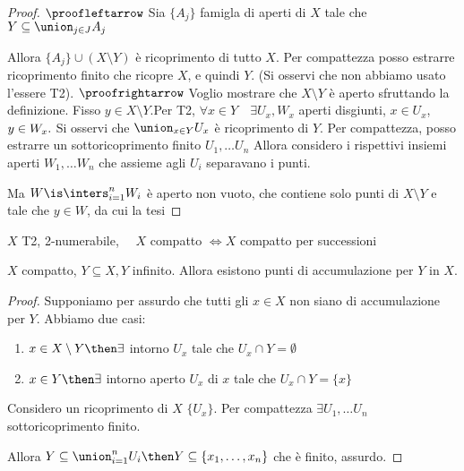 \begin{proof}
 $\proofleftarrow$
 Sia $ \{ A_j  \}$ famigla di aperti di $X$ tale che $Y\subseteq \union_{j\in J}A_j$
 
 Allora $ \{ A_j  \} \cup (X\setminus Y)$ è ricoprimento di tutto $X$.
 Per compattezza posso estrarre ricoprimento finito che ricopre $X$, e quindi $Y$. (Si osservi che non abbiamo usato l'essere T2).
 $\proofrightarrow$
 Voglio mostrare che $X\setminus Y$ è aperto sfruttando la definizione.
 Fisso $y\in X\setminus Y$.Per T2, $\forall x\in Y\quad \exists U_x, W_x$ aperti disgiunti, $x\in U_x$, $y\in W_x.\\$ 
 Si osservi che $\union_{x\in Y}U_x$ è ricoprimento di $Y$. Per compattezza, posso estrarre un sottoricoprimento finito $U_1,\dots U_n$
 Allora considero i rispettivi insiemi aperti $W_1,\dots W_n$ che assieme agli $U_i$ separavano i punti.
  
 Ma $W\is \inters_{i=1}^nW_i$ è aperto non vuoto, che contiene solo punti di $X\setminus Y$ e tale che $y\in W$, da cui la tesi  
 \end{proof}
\begin{prop}
 $X$ T2, 2-numerabile, $\quad X$ compatto $\iff X$ compatto per successioni
\end{prop}
 \begin{lemma}
  $X$ compatto, $Y\subseteq X, Y$ infinito. Allora esistono punti di accumulazione per $Y$ in $X$.
 \end{lemma}
 \begin{proof}
  Supponiamo per assurdo che tutti gli $x\in X$ non siano di accumulazione per $Y$. Abbiamo due casi:
	\begin{enumerate}
	 \item $x\in X\setminus Y\then \exists$ intorno $U_x$ tale che $U_x\cap Y = \emptyset$
	 \item $x\in Y\then \exists$ intorno aperto $U_x$ di $x$ tale che $U_x\cap Y = \{ x \}$
	\end{enumerate}
  Considero un ricoprimento di $X$ $\{ U_x \}$. Per compattezza $\exists U_1,\dots U_n$ sottoricoprimento finito.
  
  Allora $Y\subseteq \union_{i=1}^nU_i\then Y\subseteq \left \{ x_1,\dots,x_n\right \}$ che è finito, assurdo.
 \end{proof}







